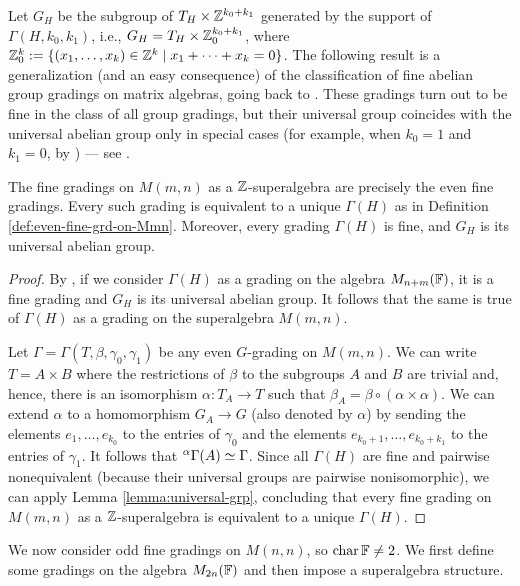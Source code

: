 Let $G_H$ be the subgroup of $T_H\times \mathbb{Z}^{k_0 + k_1}$ generated by the support of $\Gamma(H,k_0,k_1)$, i.e., 
$G_H = T_H\times \mathbb{Z}^{k_0 + k_1}_0$, where $\mathbb{Z}^k_0 := \{ (x_1, \ldots, x_k) \in \mathbb{Z}^k \mid x_1 + \cdots + x_k = 0\}$. The following result is a generalization (and an easy consequence) of the classification of fine abelian group gradings on matrix algebras, going back to \cite{HPP}. These gradings turn out to be fine in the class of all group gradings, but their universal group coincides with the universal abelian group only in special cases (for example, when $k_0 = 1$ and $k_1 = 0$, by \cite[Proposition 4.5]{CRS10}) --- see \cite[\S 2.3]{livromicha}.

\begin{thm}\label{thm:class-fine-even}
	The fine gradings on $M(m,n)$ as a $\mathbb{Z}$-superalgebra are precisely the even fine gradings.
	Every such grading is equivalent to a unique $\Gamma(H)$ as in Definition \ref{def:even-fine-grd-on-Mmn}. 
	Moreover, every grading $\Gamma(H)$ is fine, and $G_H$ is its universal abelian group.
\end{thm}

\begin{proof}
	By \cite[Proposition 2.35]{livromicha}, if we consider $\Gamma(H)$ as a grading on the algebra $M_{n+m}(\mathbb{F})$, it is a fine grading and 
	$G_H$ is its universal abelian group. It follows that the same is true of $\Gamma(H)$ as a grading on the superalgebra $M(m,n)$.

	Let $\Gamma = \Gamma(T, \beta, \gamma_0, \gamma_1)$ be any even $G$-grading on $M(m,n)$. We can write $T = A\times B$ where the restrictions of $\beta$ to 
	the subgroups $A$ and $B$ are trivial and, hence, there is an isomorphism $\alpha: T_A \to T$ such that $\beta_A=\beta\circ(\alpha\times\alpha)$. We can extend $\alpha$ to a homomorphism $G_A \to G$ (also denoted by $\alpha$) by sending the elements $e_1, \ldots, e_{k_0}$ to the entries of $\gamma_0$ and the elements $e_{k_0+1}, \ldots, e_{k_0+k_1}$ to the entries of $\gamma_1$. It follows that ${}^\alpha \Gamma(A) \simeq \Gamma$. Since all $\Gamma(H)$ are fine and pairwise nonequivalent (because their universal groups are pairwise nonisomorphic), we can apply Lemma \ref{lemma:universal-grp}, concluding that every fine grading 
	on $M(m,n)$ as a $\mathbb{Z}$-superalgebra is equivalent to a unique $\Gamma(H)$.
\end{proof}

We now consider odd fine gradings on $M(n,n)$, so $\operatorname{char}\mathbb{F}\ne 2$. We first define some gradings on the algebra $M_{2n}(\mathbb{F})$ and then impose a superalgebra structure.

